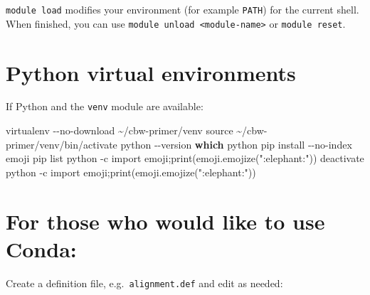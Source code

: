 \documentclass[
]{book}
\newenvironment{Shaded}{\begin{snugshade}}{\end{snugshade}}
\newcommand{\AttributeTok}[1]{\textcolor[rgb]{0.13,0.29,0.53}{#1}}
\newcommand{\BuiltInTok}[1]{#1}
\newcommand{\ExtensionTok}[1]{#1}
\newcommand{\FunctionTok}[1]{\textcolor[rgb]{0.13,0.29,0.53}{\textbf{#1}}}
\newcommand{\NormalTok}[1]{#1}
\newcommand{\StringTok}[1]{\textcolor[rgb]{0.31,0.60,0.02}{#1}}
\begin{document}
\texttt{module\ load} modifies your environment (for example \texttt{PATH}) for the current shell. When finished, you can use \texttt{module\ unload\ \textless{}module-name\textgreater{}} or \texttt{module\ reset}.

\section{Python virtual environments}\label{python-virtual-environments}

If Python and the \texttt{venv} module are available:

\begin{Shaded}
\begin{Highlighting}[]
\ExtensionTok{virtualenv} \AttributeTok{{-}{-}no{-}download}\NormalTok{ \textasciitilde{}/cbw{-}primer/venv}
\BuiltInTok{source}\NormalTok{ \textasciitilde{}/cbw{-}primer/venv/bin/activate}
\ExtensionTok{python} \AttributeTok{{-}{-}version}
\FunctionTok{which}\NormalTok{ python}
\ExtensionTok{pip}\NormalTok{ install }\AttributeTok{{-}{-}no{-}index}\NormalTok{ emoji}
\ExtensionTok{pip}\NormalTok{ list}
\ExtensionTok{python} \AttributeTok{{-}c} \StringTok{\textquotesingle{}import emoji;print(emoji.emojize(":elephant:"))\textquotesingle{}}
\ExtensionTok{deactivate}
\ExtensionTok{python} \AttributeTok{{-}c} \StringTok{\textquotesingle{}import emoji;print(emoji.emojize(":elephant:"))\textquotesingle{}}
\end{Highlighting}
\end{Shaded}

\section{For those who would like to use Conda:}\label{for-those-who-would-like-to-use-conda}

Create a definition file, e.g.~\texttt{alignment.def} and edit as needed:
\end{document}
